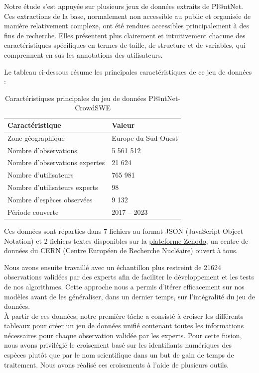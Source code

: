 \documentclass[12pt,a4paper]{article}
\begin{document}
Notre étude s’est appuyée sur plusieurs jeux de données extraits de Pl@ntNet. Ces extractions de la base, normalement non accessible au public et organisée de manière relativement complexe, ont été rendues accessibles principalement à des fins de recherche. Elles présentent plus clairement et intuitivement chacune des caractéristiques spécifiques en termes de taille, de structure et de variables, qui comprennent en sus les annotations des utilisateurs.\\

\newpage

Le tableau ci-dessous résume les principales caractéristiques de ce jeu de données :

\begin{table}[H]
\centering
\begin{tabular}{|l|l|}
\hline
\textbf{Caractéristique} & \textbf{Valeur} \\
\hline
Zone géographique & Europe du Sud-Ouest \\
Nombre d'observations & 5 561 512 \\
Nombre d'observations expertes & 21 624 \\
Nombre d'utilisateurs & 765 981 \\
Nombre d'utilisateurs experts & 98 \\
Nombre d'espèces observées & 9 132 \\
Période couverte & 2017 -- 2023 \\
\hline
\end{tabular}
\caption{Caractéristiques principales du jeu de données Pl@ntNet-CrowdSWE}
\end{table}

Ces données sont réparties dans 7 fichiers au format JSON (JavaScript Object Notation) 
et 2 fichiers textes disponibles sur la \href{https://zenodo.org/records/17913995}{plateforme Zenodo}, 
un centre de données du CERN (Centre Européen de Recherche Nucléaire) ouvert à tous.

Nous avons ensuite travaillé avec un échantillon plus restreint de \num{21624} observations validées par des experts afin de faciliter le développement et les tests de nos algorithmes. Cette approche nous a permis d'itérer efficacement sur nos modèles avant de les généraliser, dans un dernier temps, sur l'intégralité du jeu de données.\\

À partir de ces données, notre première tâche a consisté à croiser les différents tableaux pour créer un jeu de données unifié contenant toutes les informations nécessaires pour chaque observation validée par les experts. Pour cette fusion, nous avons privilégié le croisement basé sur les identifiants numériques des espèces plutôt que par le nom scientifique dans un but de gain de temps de traitement. Nous avons réalisé ces croisements à l'aide de plusieurs outils.
\end{document}
